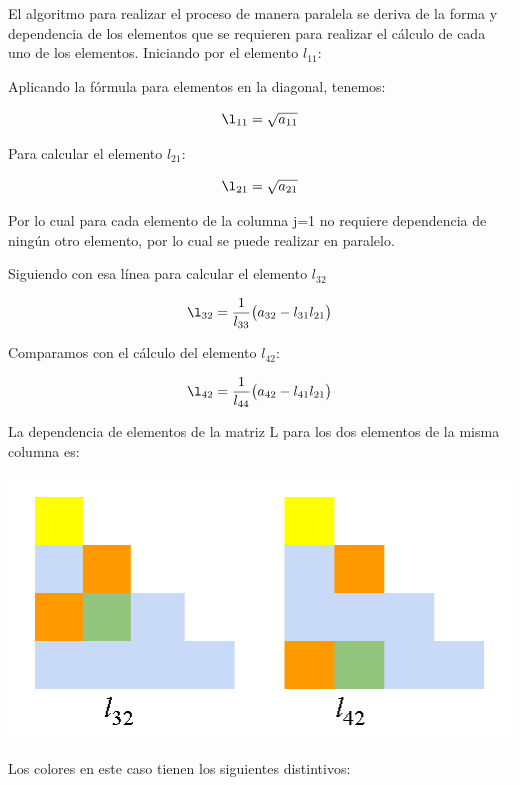 \documentclass[10pt, oneside,spanish]{article}
\begin{document}
El algoritmo para realizar el proceso de manera paralela se deriva de la forma y dependencia de los elementos que se requieren para realizar el cálculo de cada uno de los elementos.
Iniciando por el elemento $l_{11}$:

Aplicando la fórmula para elementos en la diagonal, tenemos:

\begin{equation}
\l_{11} = \sqrt{a_{11}}
\end{equation}

Para calcular el elemento $l_{21}$:

\begin{equation}
\l_{21} = \sqrt{a_{21}}
\end{equation}

Por lo cual para cada elemento de la columna j=1 no requiere dependencia de ningún otro elemento, por lo cual se puede realizar en paralelo.

Siguiendo con esa línea para calcular el elemento $l_{32}$

\begin{equation}
\l_{32} = \frac{1}{l_{33}} \big( a_{32} - {l_{31}l_{21}}\big)
\end{equation}

Comparamos con el cálculo del elemento  $l_{42}$:

\begin{equation}
\l_{42} = \frac{1}{l_{44}} \big( a_{42} - {l_{41}l_{21}}\big)
\end{equation}

La dependencia de elementos de la matriz L para los dos elementos de la misma columna es:

\begin{center}
	\includegraphics{MatrixGreen}
\end{center}


Los colores en este caso tienen los siguientes distintivos:
\end{document}
